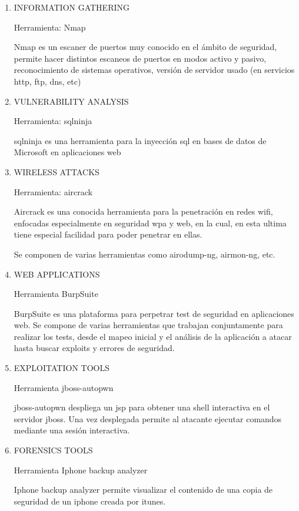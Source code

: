 \documentclass[a4paper]{article}
\begin{document}
\begin{enumerate}

\item INFORMATION GATHERING

Herramienta: Nmap

Nmap es un escaner de puertos muy conocido en el ámbito de seguridad, permite hacer distintos escaneos de puertos en modos activo y pasivo, reconocimiento de sistemas operativos, versión de servidor usado (en servicios http, ftp, dns, etc) 

\item VULNERABILITY ANALYSIS

Herramienta: sqlninja

sqlninja es una herramienta para la inyección sql en bases de datos de Microsoft en aplicaciones web 

\item WIRELESS ATTACKS

Herramienta: aircrack


Aircrack es una conocida herramienta para la penetración en redes wifi, enfocadas especialmente en seguridad wpa y web, en la cual, en esta ultima tiene especial facilidad para poder penetrar en ellas. 

Se componen de varias herramientas como airodump-ng, airmon-ng, etc.

\item WEB APPLICATIONS

Herramienta BurpSuite

BurpSuite es una plataforma para perpetrar test de seguridad en aplicaciones web. Se compone de varias herramientas que trabajan conjuntamente para realizar los tests, desde el mapeo inicial y el análisis de la aplicación a atacar hasta buscar exploits y errores de seguridad. 


\item EXPLOITATION TOOLS

Herramienta jboss-autopwn

jboss-autopwn despliega un jsp para obtener una shell interactiva en el servidor jboss. Una vez desplegada permite al atacante ejecutar comandos mediante una sesión interactiva. 


\item FORENSICS TOOLS

Herramienta Iphone backup analyzer

Iphone backup analyzer permite visualizar el contenido de una copia de seguridad de un iphone creada por itunes.



\end{enumerate}
\end{document}

